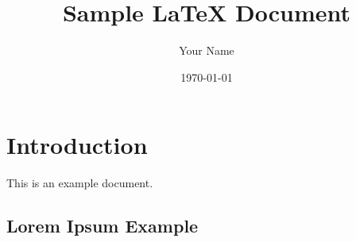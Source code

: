 \documentclass{article}
\begin{document}
\title{Sample LaTeX Document}
\author{Your Name}
\date{\today}

\maketitle

\section{Introduction}
This is an example document.

\subsection{Lorem Ipsum Example}
\lipsum[1-3]
\end{document}
